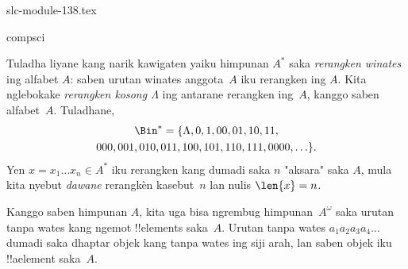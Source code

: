 \begin{filecontents*}[overwrite]{slc-module-138.tex}
\begin{tagblock}{compsci}
\begin{ex}[Rerangken]
Tuladha liyane kang narik kawigaten yaiku himpunan $A^{*}$ saka
\emph{rerangken winates} ing alfabet $A$: saben urutan winates
anggota~$A$ iku rerangken ing $A$. Kita nglebokake
\emph{rerangken kosong $\Lambda$} ing antarane rerangken ing~$A$,
kanggo saben alfabet~$A$. Tuladhane,
\begin{multline*}
\Bin^*
=\{\Lambda,0,1,00,01,10,11,\\
000,001,010,011,100,101,110,111,0000,\ldots\}.
\end{multline*}
Yen $x=x_{1}\ldots x_{n}\in A^{*}$ iku rerangken kang dumadi
saka $n$ "aksara" saka $A$, mula kita nyebut \emph{dawane}
rerangkèn kasebut~$n$ lan nulis $\len{x}=n$.
\end{ex}
\end{tagblock}

\begin{ex}
Kanggo saben himpunan $A$, kita uga bisa ngrembug himpunan~$A^\omega$
saka urutan tanpa wates kang ngemot !!{element}s saka~$A$.
Urutan tanpa wates $a_1a_2a_3a_4\dots$ dumadi saka dhaptar
objek kang tanpa wates ing siji arah, lan saben objek iku
!!a{element} saka~$A$.
\end{ex}


\end{filecontents*}


